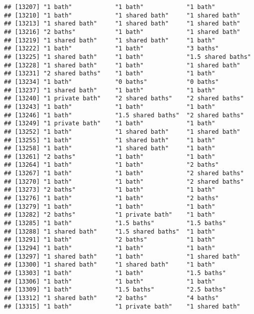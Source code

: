 \documentclass[
]{article}
\begin{document}
\begin{verbatim}
## [13207] "1 bath"            "1 bath"            "1 bath"           
## [13210] "1 bath"            "1 shared bath"     "1 shared bath"    
## [13213] "1 shared bath"     "1 shared bath"     "1 shared bath"    
## [13216] "2 baths"           "1 bath"            "1 shared bath"    
## [13219] "1 shared bath"     "1 shared bath"     "1 bath"           
## [13222] "1 bath"            "1 bath"            "3 baths"          
## [13225] "1 shared bath"     "1 bath"            "1.5 shared baths" 
## [13228] "1 shared bath"     "1 bath"            "1 shared bath"    
## [13231] "2 shared baths"    "1 bath"            "1 bath"           
## [13234] "1 bath"            "0 baths"           "0 baths"          
## [13237] "1 shared bath"     "1 bath"            "1 bath"           
## [13240] "1 private bath"    "2 shared baths"    "2 shared baths"   
## [13243] "1 bath"            "1 bath"            "1 bath"           
## [13246] "1 bath"            "1.5 shared baths"  "2 shared baths"   
## [13249] "1 private bath"    "1 bath"            "1 bath"           
## [13252] "1 bath"            "1 shared bath"     "1 shared bath"    
## [13255] "1 bath"            "1 shared bath"     "1 bath"           
## [13258] "1 bath"            "1 shared bath"     "1 bath"           
## [13261] "2 baths"           "1 bath"            "1 bath"           
## [13264] "1 bath"            "1 bath"            "2 baths"          
## [13267] "1 bath"            "1 bath"            "2 shared baths"   
## [13270] "1 bath"            "1 bath"            "2 shared baths"   
## [13273] "2 baths"           "1 bath"            "1 bath"           
## [13276] "1 bath"            "1 bath"            "2 baths"          
## [13279] "1 bath"            "1 bath"            "1 bath"           
## [13282] "2 baths"           "1 private bath"    "1 bath"           
## [13285] "1 bath"            "1.5 baths"         "1.5 baths"        
## [13288] "1 shared bath"     "1.5 shared baths"  "1 bath"           
## [13291] "1 bath"            "2 baths"           "1 bath"           
## [13294] "1 bath"            "1 bath"            "1 bath"           
## [13297] "1 shared bath"     "1 bath"            "1 shared bath"    
## [13300] "1 shared bath"     "1 shared bath"     "1 bath"           
## [13303] "1 bath"            "1 bath"            "1.5 baths"        
## [13306] "1 bath"            "1 bath"            "1 bath"           
## [13309] "1 bath"            "1.5 baths"         "2.5 baths"        
## [13312] "1 shared bath"     "2 baths"           "4 baths"          
## [13315] "1 bath"            "1 private bath"    "1 shared bath"    

\end{verbatim}
\end{document}
